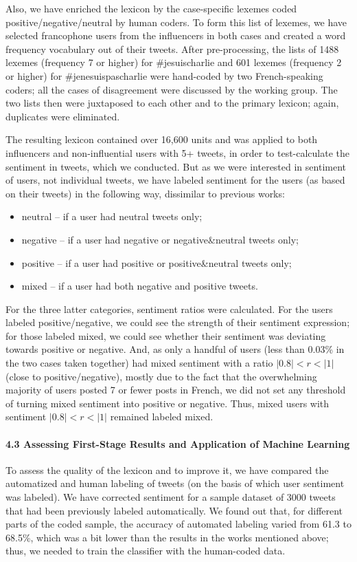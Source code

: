 Also, we have enriched the lexicon by the case-specific lexemes coded positive/negative/neutral by human coders. To form this list of lexemes, we have selected francophone users from the influencers in both cases and created a word frequency vocabulary out of their tweets. After pre-processing, the lists of 1488 lexemes (frequency 7 or higher) for \#jesuischarlie and 601 lexemes (frequency 2 or higher) for \#jenesuispascharlie were hand-coded by two French-speaking coders; all the cases of disagreement were discussed by the working group. The two lists then were juxtaposed to each other and to the primary lexicon; again, duplicates were eliminated.

The resulting lexicon contained over 16,600 units and was applied to both influencers and non-influential users with 5+ tweets, in order to test-calculate the sentiment in tweets, which we conducted. But as we were interested in sentiment of users, not individual tweets, we have labeled sentiment for the users (as based on their tweets) in the following way, dissimilar to previous works:

\begin{itemize}
	\item neutral -- if a user had neutral tweets only;
	\item negative -- if a user had negative or negative\&neutral tweets only;
	\item positive -- if a user had positive or positive\&neutral tweets only;
	\item mixed -- if a user had both negative and positive tweets.
\end{itemize}

For the three latter categories, sentiment ratios were calculated. For the users labeled positive/negative, we could see the strength of their sentiment expression; for those labeled mixed, we could see whether their sentiment was deviating towards positive or negative. And, as only a handful of users (less than 0.03\% in the two cases taken together) had mixed sentiment with a ratio \(\lvert0.8\rvert < r < \lvert1\rvert\) (close to positive/negative), mostly due to the fact that the overwhelming majority of users posted 7 or fewer posts in French, we did not set any threshold of turning mixed sentiment into positive or negative. Thus, mixed users with sentiment \(\lvert0.8\rvert < r < \lvert1\rvert\) remained labeled mixed.

\paragraph{4.3 Assessing First-Stage Results and Application of Machine Learning} To assess the quality of the lexicon and to improve it, we have compared the automatized and human labeling of tweets (on the basis of which user sentiment was labeled). We have corrected sentiment for a sample dataset of 3000 tweets that had been previously labeled automatically. We found out that, for different parts of the coded sample, the accuracy of automated labeling varied from 61.3 to 68.5\%, which was a bit lower than the results in the works mentioned above; thus, we needed to train the classifier with the human-coded data.

